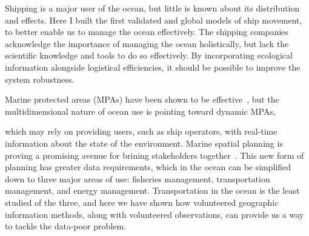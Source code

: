 
Shipping is a major user of the ocean, but little is known about its distribution and effects. Here I built the first validated and global models of ship movement, to better enable us to manage the ocean effectively. The shipping companies acknowledge the importance of managing the ocean holistically, but lack the scientific knowledge and tools to do so effectively. By incorporating ecological information alongside logistical efficiencies, it should be possible to improve the system robustness.

Marine protected areas (MPAs) have been shown to be effective~\citep{halpern2002marine}, but the multidimensional nature of ocean use is pointing toward dynamic MPAs,\citep{Boersma1999} %

 which may rely on providing users, such as ship operators, with real-time information about the state of the environment. Marine spatial planning is proving a promising avenue for brining stakeholders together~\citep{merrifield2012marinemap}. This new form of planning has greater data requirements, which in the ocean can be simplified down to three major areas of use: fisheries management, transportation management, and energy management. Transportation in the ocean is the least studied of the three, and here we have shown how volunteered geographic information methods, along with volunteered observations, can provide us a way to tackle the data-poor problem.



